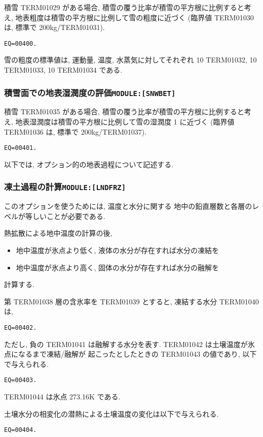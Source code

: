 積雪 TERM01029 がある場合, 
積雪の覆う比率が積雪の平方根に比例すると考え,
地表粗度は積雪の平方根に比例して雪の粗度に近づく
(臨界値 TERM01030 は, 標準で 200kg/TERM01031).
%
\begin{verbatim}
EQ=00400.
\end{verbatim}
%
雪の粗度の標準値は, 運動量, 温度, 水蒸気に対してそれぞれ
10 TERM01032, 10 TERM01033, 10 TERM01034 である. 

\subsubsection{積雪面での地表湿潤度の評価\texttt{MODULE:[SNWBET]}}

積雪 TERM01035 がある場合, 
積雪の覆う比率が積雪の平方根に比例すると考え,
地表湿潤度は積雪の平方根に比例して雪の湿潤度 1 に近づく
(臨界値 TERM01036 は, 標準で 200kg/TERM01037).
%
\begin{verbatim}
EQ=00401.
\end{verbatim}

\bigskip
以下では, オプション的の地表過程について記述する.
\bigskip

\subsubsection{凍土過程の計算\texttt{MODULE:[LNDFRZ]}}

このオプションを使うためには, 温度と水分に関する
地中の鉛直層数と各層のレベルが等しいことが必要である. 

熱拡散による地中温度の計算の後, 
\begin{itemize}
  \item 地中温度が氷点より低く, 液体の水分が存在すれば水分の凍結を
  \item 地中温度が氷点より高く, 固体の水分が存在すれば水分の融解を
\end{itemize}
計算する. 

第 TERM01038 層の含氷率を TERM01039 とすると, 凍結する水分 TERM01040 は, 
\begin{verbatim}
EQ=00402.
\end{verbatim}
ただし, 負の TERM01041 は融解する水分を表す. 
TERM01042 は土壌温度が氷点になるまで凍結/融解が
起こったとしたときの TERM01043 の値であり, 以下で与えられる. 
\begin{verbatim}
EQ=00403.
\end{verbatim}
TERM01044 は氷点 273.16K である. 

土壌水分の相変化の潜熱による土壌温度の変化は以下で与えられる. 
\begin{verbatim}
EQ=00404.
\end{verbatim}

